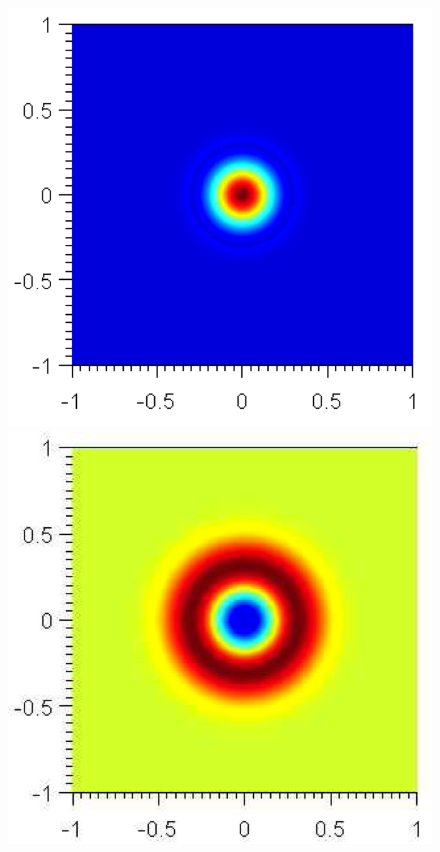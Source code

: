 \begin{figure}
	\includegraphics{Figures/Prop_1.png}
	\includegraphics{Figures/Prop_2.png}

\end{figure}
